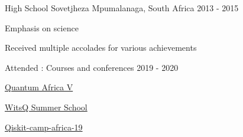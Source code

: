 \begin{cventries}
  \cventry
    {High School} %
    {Sovetjheza} %
    {Mpumalanaga, South Africa}
    {2013 - 2015} %
    {
      \begin{cvitems} %
        \item {Emphasis on science}
        \item {Received multiple accolades for various achievements}
      \end{cvitems}
    }


  \cventry
    {Attended : } %
    {Courses and conferences} %
    {} %
    {2019 - 2020} %
    {
        \begin{cvitems} %
            \item {\href{https://quantumafrica5.weebly.com/}{Quantum Africa V}}
            \item
                {\href{https://www.wits.ac.za/quantum-computing/summer-school/}{WitsQ
            Summer School}}
            \item {\href{https://qiskit.org/events/africa/}{Qiskit-camp-africa-19}}
        \end{cvitems}
    }

\end{cventries}


